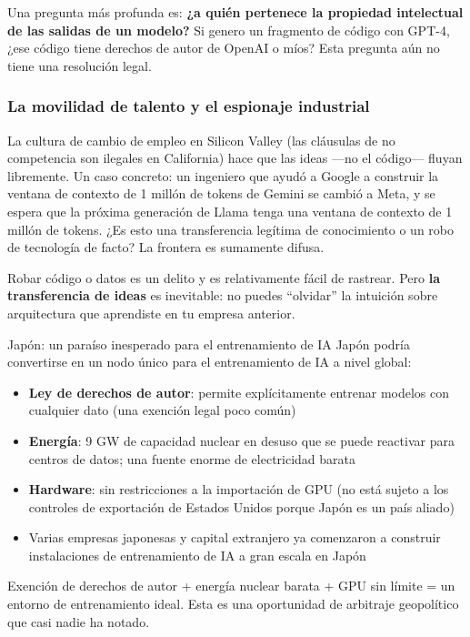 Una pregunta más profunda es: \textbf{¿a quién pertenece la propiedad intelectual de las salidas de un modelo?} Si genero un fragmento de código con GPT-4, ¿ese código tiene derechos de autor de OpenAI o míos? Esta pregunta aún no tiene una resolución legal.

\subsubsection{La movilidad de talento y el espionaje industrial}

La cultura de cambio de empleo en Silicon Valley (las cláusulas de no competencia son ilegales en California) hace que las ideas —no el código— fluyan libremente. Un caso concreto: un ingeniero que ayudó a Google a construir la ventana de contexto de 1 millón de tokens de Gemini se cambió a Meta, y se espera que la próxima generación de Llama tenga una ventana de contexto de 1 millón de tokens. ¿Es esto una transferencia legítima de conocimiento o un robo de tecnología de facto? La frontera es sumamente difusa.

Robar código o datos es un delito y es relativamente fácil de rastrear. Pero \textbf{la transferencia de ideas} es inevitable: no puedes ``olvidar'' la intuición sobre arquitectura que aprendiste en tu empresa anterior.

\begin{knowledgebox}{Japón: un paraíso inesperado para el entrenamiento de IA}
Japón podría convertirse en un nodo único para el entrenamiento de IA a nivel global:
\begin{itemize}
    \item \textbf{Ley de derechos de autor}: permite explícitamente entrenar modelos con cualquier dato (una exención legal poco común)
    \item \textbf{Energía}: 9 GW de capacidad nuclear en desuso que se puede reactivar para centros de datos; una fuente enorme de electricidad barata
    \item \textbf{Hardware}: sin restricciones a la importación de GPU (no está sujeto a los controles de exportación de Estados Unidos porque Japón es un país aliado)
    \item Varias empresas japonesas y capital extranjero ya comenzaron a construir instalaciones de entrenamiento de IA a gran escala en Japón
\end{itemize}

Exención de derechos de autor + energía nuclear barata + GPU sin límite = un entorno de entrenamiento ideal. Esta es una oportunidad de arbitraje geopolítico que casi nadie ha notado.
\end{knowledgebox}


